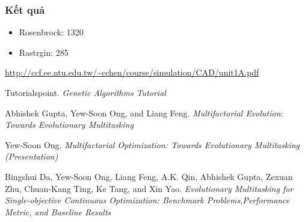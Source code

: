 \documentclass[a4paper,12pt]{report}
\begin{document}
\subsubsection{Kết quả} 
\begin{itemize}
\item Rosenbrock: 1320  
\item Rastrgin: 285
\end{itemize}


\begin{thebibliography}{9}
 \url{http://ccf.ee.ntu.edu.tw/~cchen/course/simulation/CAD/unit1A.pdf}

 Tutorialspoint. \textit{Genetic Algorithms Tutorial}

 Abhishek Gupta, Yew-Soon Ong, and Liang Feng. \textit{Multifactorial Evolution: Towards Evolutionary Multitasking}

 Yew-Soon Ong. \textit{Multifactorial Optimization: Towards Evolutionary Multitasking (Presentation)} 

 Bingshui Da, Yew-Soon Ong, Liang Feng, A.K. Qin, Abhishek Gupta, Zexuan Zhu, Chuan-Kang Ting, Ke Tang, and Xin Yao. \textit{Evolutionary Multitasking for Single-objective Continuous Optimization: Benchmark Problems,Performance Metric, and Baseline Results}

\end{thebibliography}
\end{document}
